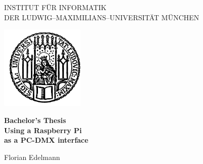 
\thispagestyle{empty}

\begin{center}

\vspace*{-1cm}

{\Huge INSTITUT FÜR INFORMATIK\\[1mm]}
DER LUDWIG--MAXIMILIANS--UNIVERSITÄT MÜNCHEN\\

\vspace*{1cm}

\includegraphics[width=0.3\textwidth]{Titel/lmu_siegel}

\vspace*{3cm}

{\Large \textbf{Bachelor's Thesis}}\\ %

\vspace{2.0cm}
{\Huge \textbf{Using a Raspberry Pi}}\\
\vspace*{3mm}
{\Huge \textbf{as a PC-DMX interface}}\\
\vspace{1.5cm}

{\LARGE Florian Edelmann} %

\end{center}

\newpage


\thispagestyle{empty}
\cleardoublepage


\thispagestyle{empty}

